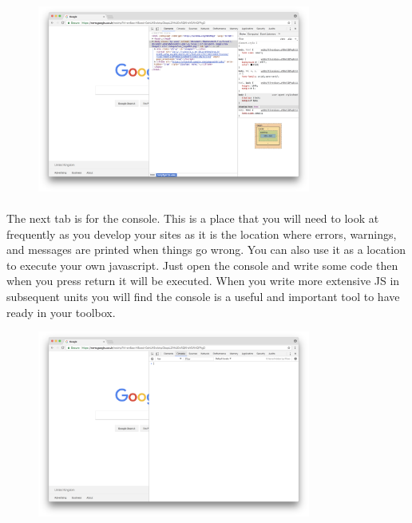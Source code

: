 \begin{figure}[H]
\centering
\includegraphics[width=0.8\textwidth]{figures/devtools_elements.png}
\label{fig:devtools_elements}
\end{figure}

\paragraph{} The next tab is for the console. This is a place that you will need to look at frequently as you develop your sites as it is the location where errors, warnings, and messages are printed when things go wrong.  You can also use it as a location to execute your own javascript. Just open the console and write some code then when you press return it will be executed. When you write more extensive JS in subsequent units you will find the console is a useful and important tool to have ready in your toolbox.


\begin{figure}[H]
\centering
\includegraphics[width=0.8\textwidth]{figures/devtools_console.png}
\label{fig:devtools_console}
\end{figure}


